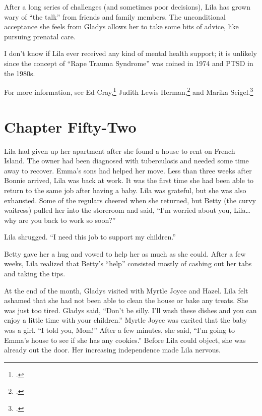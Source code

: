 \documentclass[
  american,
  letterpaper,
]{book}
\begin{document}
After a long series of challenges (and sometimes poor decisions), Lila
has grown wary of ``the talk'' from friends and family members. The
unconditional acceptance she feels from Gladys allows her to take some
bits of advice, like pursuing prenatal care.

I don't know if Lila ever received any kind of mental health support; it
is unlikely since the concept of ``Rape Trauma Syndrome'' was coined in
1974 and PTSD in the 1980s.

For more information, see Ed Cray,\footnote{.} Judith Lewis Herman,\footnote{.} and Marika
Seigel.\footnote{.}


\chapter{Chapter Fifty-Two}\label{chapter-fifty-two}

Lila had given up her apartment after she found a house to rent on
French Island. The owner had been diagnosed with tuberculosis and needed
some time away to recover. Emma's sons had helped her move. Less than
three weeks after Bonnie arrived, Lila was back at work. It was the
first time she had been able to return to the same job after having a
baby. Lila was grateful, but she was also exhausted. Some of the
regulars cheered when she returned, but Betty (the curvy waitress)
pulled her into the storeroom and said, ``I'm worried about you,
Lila\ldots why are you back to work so soon?''

Lila shrugged. ``I need this job to support my children.''

Betty gave her a hug and vowed to help her as much as she could. After a
few weeks, Lila realized that Betty's ``help'' consisted mostly of
cashing out her tabs and taking the tips.

At the end of the month, Gladys visited with Myrtle Joyce and Hazel.
Lila felt ashamed that she had not been able to clean the house or bake
any treats. She was just too tired. Gladys said, ``Don't be silly. I'll
wash these dishes and you can enjoy a little time with your children.''
Myrtle Joyce was excited that the baby was a girl. ``I told you, Mom!''
After a few minutes, she said, ``I'm going to Emma's house to see if she
has any cookies.'' Before Lila could object, she was already out the
door. Her increasing independence made Lila nervous.
\end{document}
